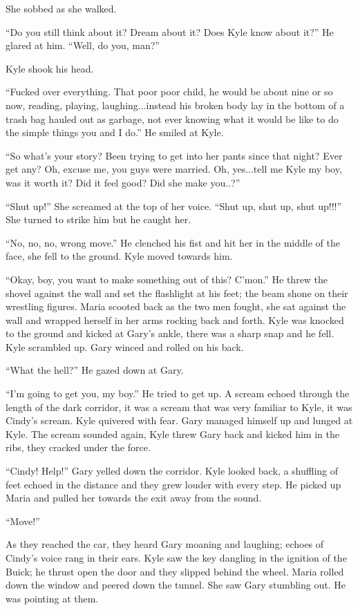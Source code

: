 She sobbed as she walked.

``Do you still think about it? Dream about it? Does Kyle know about
it?'' He glared at him. ``Well, do you, man?''

Kyle shook his head.

``Fucked over everything. That poor poor child, he would be about nine
or so now, reading, playing, laughing...instead his broken body lay in
the bottom of a trash bag hauled out as garbage, not ever knowing what
it would be like to do the simple things you and I do.'' He smiled at
Kyle.

``So what's your story? Been trying to get into her pants since that
night? Ever get any? Oh, excuse me, you guys were married. Oh,
yes...tell me Kyle my boy, was it worth it? Did it feel good? Did she
make you..?''

``Shut up!'' She screamed at the top of her voice. ``Shut up, shut up,
shut up!!!'' She turned to strike him but he caught her.

``No, no, no, wrong move.'' He clenched his fist and hit her in the
middle of the face, she fell to the ground. Kyle moved towards him.

``Okay, boy, you want to make something out of this? C'mon.'' He threw
the shovel against the wall and set the flashlight at his feet; the beam
shone on their wrestling figures. Maria scooted back as the two men
fought, she sat against the wall and wrapped herself in her arms rocking
back and forth. Kyle was knocked to the ground and kicked at Gary's
ankle, there was a sharp snap and he fell. Kyle scrambled up. Gary
winced and rolled on his back.

``What the hell?'' He gazed down at Gary.

``I'm going to get you, my boy.'' He tried to get up. A scream echoed
through the length of the dark corridor, it was a scream that was very
familiar to Kyle, it was Cindy's scream. Kyle quivered with fear. Gary
managed himself up and lunged at Kyle. The scream sounded again, Kyle
threw Gary back and kicked him in the ribs, they cracked under the
force.

``Cindy! Help!'' Gary yelled down the corridor. Kyle looked back, a
shuffling of feet echoed in the distance and they grew louder with every
step. He picked up Maria and pulled her towards the exit away from the
sound.

``Move!''

As they reached the car, they heard Gary moaning and laughing; echoes of
Cindy's voice rang in their ears. Kyle saw the key dangling in the
ignition of the Buick; he thrust open the door and they slipped behind
the wheel. Maria rolled down the window and peered down the tunnel. She
saw Gary stumbling out. He was pointing at them.

